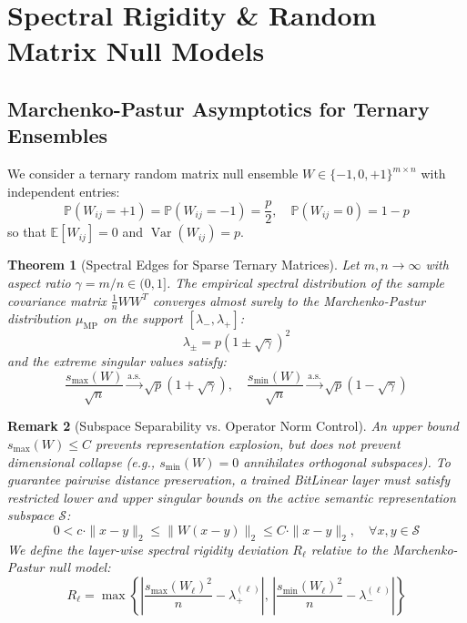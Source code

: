 \documentclass[11pt,a4paper]{article}
\newtheorem{theorem}{Theorem}[section]
\newtheorem{remark}[theorem]{Remark}
\begin{document}
\section{Spectral Rigidity \& Random Matrix Null Models}

\subsection{Marchenko-Pastur Asymptotics for Ternary Ensembles}
We consider a ternary random matrix null ensemble $W \in \{-1, 0, +1\}^{m \times n}$ with independent entries:
\begin{equation}
    \mathbb{P}(W_{ij} = +1) = \mathbb{P}(W_{ij} = -1) = \frac{p}{2}, \quad \mathbb{P}(W_{ij} = 0) = 1 - p
\end{equation}
so that $\mathbb{E}[W_{ij}] = 0$ and $\operatorname{Var}(W_{ij}) = p$.

\begin{theorem}[Spectral Edges for Sparse Ternary Matrices]
Let $m, n \to \infty$ with aspect ratio $\gamma = m/n \in (0, 1]$. The empirical spectral distribution of the sample covariance matrix $\frac{1}{n} W W^T$ converges almost surely to the Marchenko-Pastur distribution $\mu_{\text{MP}}$ on the support $[\lambda_-, \lambda_+]$:
\begin{equation}
    \lambda_\pm = p \left(1 \pm \sqrt{\gamma}\right)^2
\end{equation}
and the extreme singular values satisfy:
\begin{equation}
    \frac{s_{\max}(W)}{\sqrt{n}} \xrightarrow{\text{a.s.}} \sqrt{p}\left(1 + \sqrt{\gamma}\right), \quad \frac{s_{\min}(W)}{\sqrt{n}} \xrightarrow{\text{a.s.}} \sqrt{p}\left(1 - \sqrt{\gamma}\right)
\end{equation}
\end{theorem}

\begin{remark}[Subspace Separability vs. Operator Norm Control]
An upper bound $s_{\max}(W) \le C$ prevents representation explosion, but does not prevent dimensional collapse (e.g., $s_{\min}(W) = 0$ annihilates orthogonal subspaces). To guarantee pairwise distance preservation, a trained BitLinear layer must satisfy restricted lower and upper singular bounds on the active semantic representation subspace $\mathcal{S}$:
\begin{equation}
    0 < c \cdot \|x - y\|_2 \le \|W(x - y)\|_2 \le C \cdot \|x - y\|_2, \quad \forall x, y \in \mathcal{S}
\end{equation}
We define the layer-wise spectral rigidity deviation $R_\ell$ relative to the Marchenko-Pastur null model:
\begin{equation}
    R_\ell = \max\left\{ \left|\frac{s_{\max}(W_\ell)^2}{n} - \lambda_+^{(\ell)}\right|,\, \left|\frac{s_{\min}(W_\ell)^2}{n} - \lambda_-^{(\ell)}\right| \right\}
\end{equation}
\end{remark}
\end{document}
